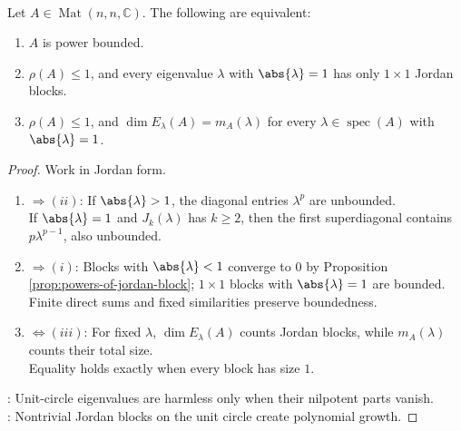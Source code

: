 \begin{theorem} \label{thm:matrix-power-bounded-jordan-criterion} \\
Let $A\in\operatorname{Mat}(n,n,\mathbb{C})$. The following are equivalent:
\begin{enumerate}[label=(\roman*)]
\setlength{\itemsep}{0pt}
\item $A$ is power bounded.
\item $\rho(A)\leq1$, and every eigenvalue $\lambda$ with $\abs{\lambda}=1$ has only $1\times1$ Jordan blocks.
\item $\rho(A)\leq1$, and $\dim E_{\lambda}(A)=m_A(\lambda)$ for every $\lambda\in\operatorname{spec}(A)$ with $\abs{\lambda}=1$.
\end{enumerate}
\begin{proof}
Work in Jordan form.
\begin{enumerate}[label=(\roman*)]
\setlength{\itemsep}{0pt}
\item[$(i)$]$\Rightarrow(ii)$: If $\abs{\lambda}>1$, the diagonal entries $\lambda^p$ are unbounded.\\
If $\abs{\lambda}=1$ and $J_k(\lambda)$ has $k\geq2$, then the first superdiagonal contains $p\lambda^{p-1}$, also unbounded.
\item[$(ii)$]$\Rightarrow(i)$: Blocks with $\abs{\lambda}<1$ converge to $0$ by Proposition \ref{prop:powers-of-jordan-block}; $1\times1$ blocks with $\abs{\lambda}=1$ are bounded. Finite direct sums and fixed similarities preserve boundedness.
\item[$(ii)$]$\Leftrightarrow(iii)$: For fixed $\lambda$, $\dim E_{\lambda}(A)$ counts Jordan blocks, while $m_A(\lambda)$ counts their total size.\\
Equality holds exactly when every block has size $1$.
\end{enumerate}
: Unit-circle eigenvalues are harmless only when their nilpotent parts vanish.\\
: Nontrivial Jordan blocks on the unit circle create polynomial growth.
\end{proof}
\end{theorem}
